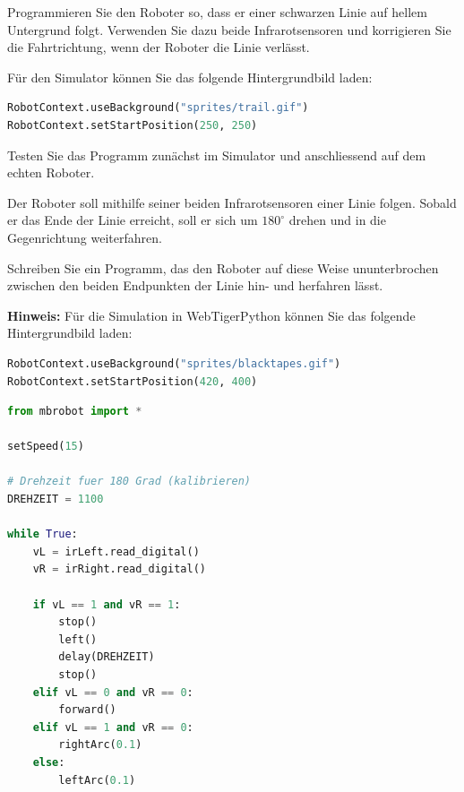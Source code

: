 \begin{myexercise}
    Programmieren Sie den Roboter so, dass er einer schwarzen Linie auf hellem Untergrund folgt. Verwenden Sie dazu beide Infrarotsensoren und korrigieren Sie die Fahrtrichtung, wenn der Roboter die Linie verlässt.

    Für den Simulator können Sie das folgende Hintergrundbild laden:
    \begin{lstlisting}[language=Python]
RobotContext.useBackground("sprites/trail.gif")
RobotContext.setStartPosition(250, 250)
    \end{lstlisting}
    Testen Sie das Programm zunächst im Simulator und anschliessend auf dem echten Roboter.
\end{myexercise}
\begin{myexercise}
    Der Roboter soll mithilfe
    seiner beiden Infrarotsensoren einer Linie folgen.
    Sobald er das Ende der Linie erreicht, soll er
    sich um \(180^\circ\) drehen und in die Gegenrichtung
    weiterfahren.

    Schreiben Sie ein Programm, das den Roboter auf
    diese Weise ununterbrochen zwischen den beiden
    Endpunkten der Linie hin- und herfahren lässt.

    \textbf{Hinweis:} Für die Simulation in WebTigerPython
    können Sie das folgende Hintergrundbild laden:

    \begin{lstlisting}[language=Python]
RobotContext.useBackground("sprites/blacktapes.gif")
RobotContext.setStartPosition(420, 400)
\end{lstlisting}

    \begin{myanswer}
        \begin{lstlisting}[language=Python]
from mbrobot import *

setSpeed(15)

# Drehzeit fuer 180 Grad (kalibrieren)
DREHZEIT = 1100

while True:
    vL = irLeft.read_digital()
    vR = irRight.read_digital()

    if vL == 1 and vR == 1:
        stop()
        left()
        delay(DREHZEIT)
        stop()
    elif vL == 0 and vR == 0:
        forward()
    elif vL == 1 and vR == 0:
        rightArc(0.1)
    else:
        leftArc(0.1)


\end{lstlisting}
\end{myanswer}
\end{myexercise}
